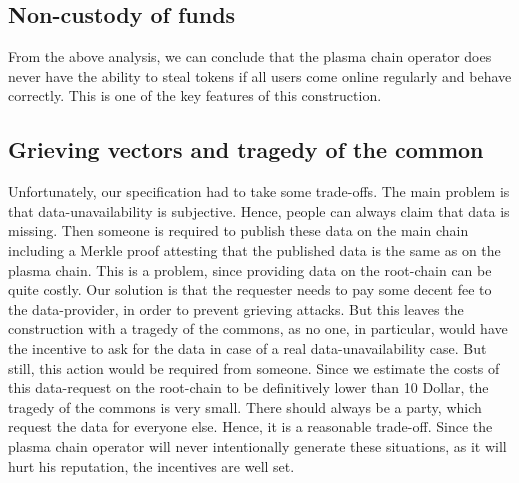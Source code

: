 \documentclass[11pt,parskip=full]{scrartcl}%
\begin{document}
\subsection{Non-custody of funds}
From the above analysis, we can conclude that the plasma chain operator does never have the ability to steal tokens if all users come online regularly and behave correctly. This is one of the key features of this construction.

\subsection{Grieving vectors and tragedy of the common}
Unfortunately, our specification had to take some trade-offs. The main problem is that data-unavailability is subjective. Hence, people can always claim that data is missing. Then someone is required to publish these data on the main chain including a Merkle proof attesting that the published data is the same as on the plasma chain.
This is a problem, since providing data on the root-chain can be quite costly. Our solution is that the requester needs to pay some decent fee to the data-provider, in order to prevent grieving attacks. But this leaves the construction with a tragedy of the commons, as no one, in particular, would have the incentive to ask for the data in case of a real data-unavailability case. But still, this action would be required from someone. \newline 
Since we estimate the costs of this data-request on the root-chain to be definitively lower than 10 Dollar, the tragedy of the commons is very small. There should always be a party, which request the data for everyone else. Hence, it is a reasonable trade-off. \newline Since the plasma chain operator will never intentionally generate these situations, as it will hurt his reputation, the incentives are well set. 
\end{document}
